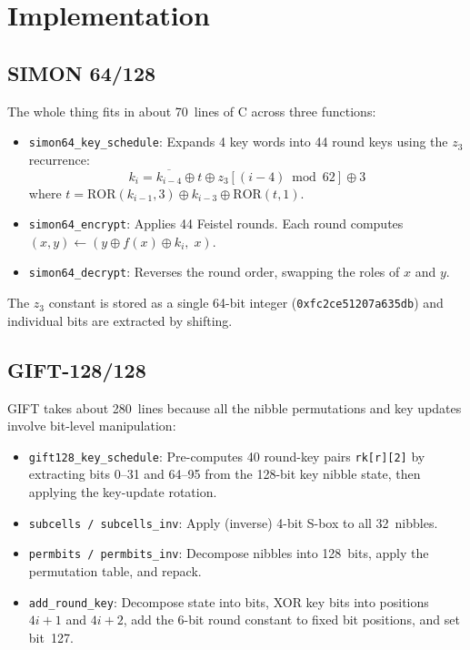 \documentclass[conference]{IEEEtran}
\begin{document}
\section{Implementation}

\subsection{SIMON 64/128}

The whole thing fits in about 70~lines of C across three functions:

\begin{itemize}
\item \texttt{simon64\_key\_schedule}: Expands 4 key words into 44 round
      keys using the $z_3$ recurrence:
      \[
      k_i = \overline{k_{i-4}} \oplus t \oplus z_3[(i{-}4) \bmod 62]
            \oplus 3
      \]
      where $t = \text{ROR}(k_{i-1}, 3) \oplus k_{i-3} \oplus
      \text{ROR}(t, 1)$.
\item \texttt{simon64\_encrypt}: Applies 44 Feistel rounds.  Each round
      computes $(x, y) \leftarrow (y \oplus f(x) \oplus k_i,\; x)$.
\item \texttt{simon64\_decrypt}: Reverses the round order, swapping the
      roles of $x$ and $y$.
\end{itemize}

The $z_3$ constant is stored as a single 64-bit integer
(\texttt{0xfc2ce51207a635db}) and individual bits are extracted by shifting.

\subsection{GIFT-128/128}

GIFT takes about 280~lines because all the nibble permutations and
key updates involve bit-level manipulation:

\begin{itemize}
\item \texttt{gift128\_key\_schedule}: Pre-computes 40 round-key pairs
      \texttt{rk[r][2]} by extracting bits 0--31 and 64--95 from the
      128-bit key nibble state, then applying the key-update rotation.
\item \texttt{subcells / subcells\_inv}: Apply (inverse) 4-bit S-box to
      all 32~nibbles.
\item \texttt{permbits / permbits\_inv}: Decompose nibbles into 128~bits,
      apply the permutation table, and repack.
\item \texttt{add\_round\_key}: Decompose state into bits, XOR key bits
      into positions $4i{+}1$ and $4i{+}2$, add the 6-bit round constant
      to fixed bit positions, and set bit~127.
\end{itemize}
\end{document}
